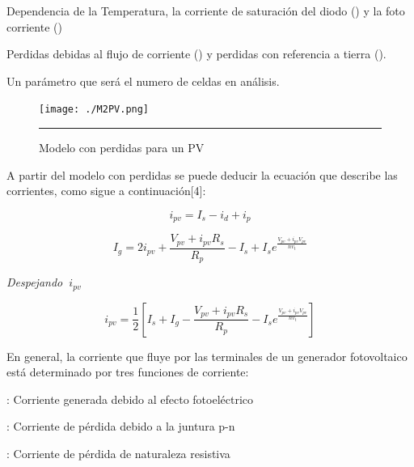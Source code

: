 \begin{compactitem}

\item Dependencia de la Temperatura, la corriente de saturación del diodo () y la foto corriente ()


\item Perdidas debidas al flujo de corriente () y perdidas con referencia a tierra ().

\item  Un parámetro  que será el numero de celdas en análisis. 

\end{compactitem}

\begin{figure}[H]
  \centering
    \texttt{[image: ./M2PV.png]}
    \rule{35em}{0.5pt}
  \caption[Modelo con perdidas para un PV]{ Modelo con perdidas para un PV}
  \label{fig:Modelo2_PV}
\end{figure}

A partir del modelo con perdidas se puede deducir la ecuación que describe las corrientes, como sigue a continuación[4]:

\begin{equation} \label{eq:ej1}
  i_{pv}
  = I_{s} - i_{d} + i_{p}
\end{equation}

\begin{equation} \label{eq:ej2}
  I_{g}
  =
  2i_{pv} + \frac{V_{pv}+i_{pv}R_{s}}{R_p} -  I_{s} + I_{s}e^{ \frac{V_{pv}+i_{pv}V_{pv}}{n v_t}} 
\end{equation}

\textsl{Despejando $\ i_{pv}$}

\begin{equation} \label{eq:ej3}
  i_{pv} 
  =
  \frac{1}{2} \left[I_{s} + I_{g} - \frac{V_{pv}+i_{pv}R_{s}}{R_p} - I_{s}e^{ \frac{V_{pv}+i_{pv}V_{pv}}{n v_t}} \right]
\end{equation}
  
  
En general, la corriente que fluye por las terminales de un generador fotovoltaico está determinado por tres funciones de corriente:
\begin{compactitem}
\item {}: Corriente generada debido al efecto fotoeléctrico
\item {}: Corriente de pérdida debido a la juntura p-n
\item {}: Corriente de pérdida de naturaleza resistiva
\end{compactitem}


